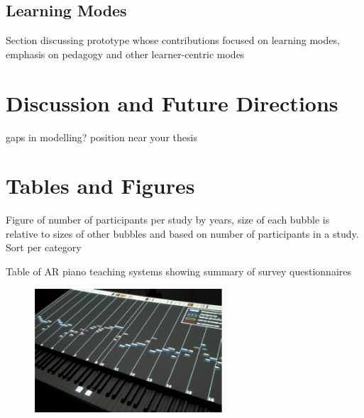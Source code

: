 \documentclass[manuscript,screen]{acmart}
\begin{document}
\subsection{Learning Modes}
\label{subsec: learn}
Section discussing prototype whose contributions focused on learning modes, emphasis on pedagogy and other learner-centric modes


\section{Discussion and Future Directions}
\label{sec: discuss}
gaps in modelling? position near your thesis

\section{Tables and Figures}
Figure of number of participants per study by years, size of each bubble is relative to sizes of other bubbles and based on number of participants in a study. Sort per category 

Table of AR piano teaching systems showing summary of survey
questionnaires




\begin{figure}
    \centering
    \includegraphics[width=7cm]{figures/piano}
    \caption{\cite{rogers2014piano}}
    \label{fig:rogers2014piano}
\end{figure}
\end{document}
